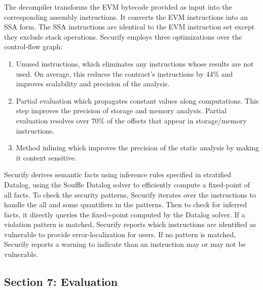 \documentclass{article}
\begin{document}
The decompiler transforms the EVM bytecode provided as input into the corresponding assembly instructions. It converts the EVM instructions into an SSA form. The SSA instructions are identical to the EVM instruction set except they exclude stack operations. Securify employs three optimizations over the control-flow graph:
\begin{enumerate}
    \item Unused instructions, which eliminates any instructions whose results are not used. On average, this reduces the contract's instructions by 44\% and improves scalability and precision of the analysis.
    \item Partial evaluation which propagates constant values along computations. This step improves the precision of storage and memory analysis. Partial evaluation resolves over 70\% of the offsets that appear in storage/memory instructions.
    \item Method inlining which improves the precision of the static analysis by making it context sensitive.
\end{enumerate}
Securify derives semantic facts using inference rules specified in stratified Datalog, using the Souffle Datalog solver to efficiently compute a fixed-point of all facts. To check the security patterns, Securify iterates over the instructions to handle the all and some quantifiers in the patterns. Then to check for inferred facts, it directly queries the fixed=point computed by the Datalog solver. If a violation pattern is matched, Securify reports which instructions are identified as vulnerable to provide error-localization for users. If no pattern is matched, Securify reports a warning to indicate than an instruction may or may not be vulnerable.

\subsection{Section 7: Evaluation}
\end{document}
